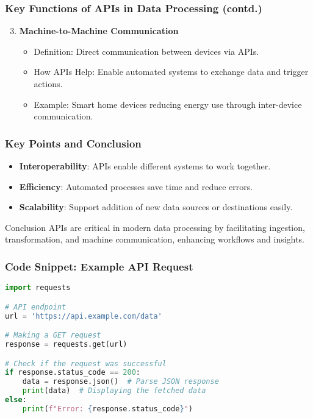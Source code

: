\documentclass[aspectratio=169]{beamer}
\begin{document}
\begin{frame}[fragile]
    \frametitle{Key Functions of APIs in Data Processing (contd.)}
    \begin{enumerate}
        \setcounter{enumi}{2}
        \item \textbf{Machine-to-Machine Communication}
            \begin{itemize}
                \item Definition: Direct communication between devices via APIs.
                \item How APIs Help: Enable automated systems to exchange data and trigger actions.
                \item Example: Smart home devices reducing energy use through inter-device communication.
            \end{itemize}
    \end{enumerate}
\end{frame}

\begin{frame}[fragile]
    \frametitle{Key Points and Conclusion}
    \begin{itemize}
        \item \textbf{Interoperability}: APIs enable different systems to work together.
        \item \textbf{Efficiency}: Automated processes save time and reduce errors.
        \item \textbf{Scalability}: Support addition of new data sources or destinations easily.
    \end{itemize}
    
    \begin{block}{Conclusion}
        APIs are critical in modern data processing by facilitating ingestion, transformation, and machine communication, enhancing workflows and insights.
    \end{block}
\end{frame}

\begin{frame}[fragile]
    \frametitle{Code Snippet: Example API Request}
    \begin{lstlisting}[language=Python]
import requests

# API endpoint
url = 'https://api.example.com/data'

# Making a GET request
response = requests.get(url)

# Check if the request was successful
if response.status_code == 200:
    data = response.json()  # Parse JSON response
    print(data)  # Displaying the fetched data
else:
    print(f"Error: {response.status_code}")
    \end{lstlisting}
\end{frame}
\end{document}
